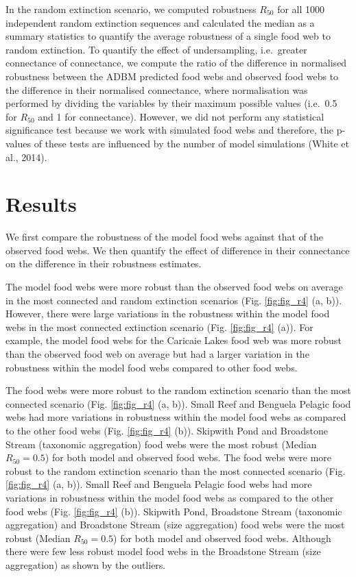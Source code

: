 \documentclass{article}
\begin{document}
In the random extinction scenario, we computed robustness \(R_{50}\) for
all 1000 independent random extinction sequences and calculated the
median as a summary statistics to quantify the average robustness of a
single food web to random extinction. To quantify the effect of
undersampling, i.e.~greater connectance of connectance, we compute the
ratio of the difference in normalised robustness between the ADBM
predicted food webs and observed food webs to the difference in their
normalised connectance, where normalisation was performed by dividing
the variables by their maximum possible values (i.e.~0.5 for \(R_{50}\)
and 1 for connectance). However, we did not perform any statistical
significance test because we work with simulated food webs and
therefore, the p-values of these tests are influenced by the number of
model simulations (White et al., 2014).

\hypertarget{results}{%
\section{Results}\label{results}}

We first compare the robustness of the model food webs against that of
the observed food webs. We then quantify the effect of difference in
their connectance on the difference in their robustness estimates.

The model food webs were more robust than the observed food webs on
average in the most connected and random extinction scenarios (Fig.
\ref{fig:fig_r4} (a, b)). However, there were large variations in the
robustness within the model food webs in the most connected extinction
scenario (Fig. \ref{fig:fig_r4} (a)). For example, the model food webs
for the Caricaie Lakes food web was more robust than the observed food
web on average but had a larger variation in the robustness within the
model food webs compared to other food webs.

The food webs were more robust to the random extinction scenario than
the most connected scenario (Fig. \ref{fig:fig_r4} (a, b)). Small Reef
and Benguela Pelagic food webs had more variations in robustness within
the model food webs as compared to the other food webs (Fig.
\ref{fig:fig_r4} (b)). Skipwith Pond and Broadstone Stream (taxonomic
aggregation) food webs were the most robust (Median \(R_{50} = 0.5\))
for both model and observed food webs. The food webs were more robust to
the random extinction scenario than the most connected scenario (Fig.
\ref{fig:fig_r4} (a, b)). Small Reef and Benguela Pelagic food webs had
more variations in robustness within the model food webs as compared to
the other food webs (Fig. \ref{fig:fig_r4} (b)). Skipwith Pond,
Broadstone Stream (taxonomic aggregation) and Broadstone Stream (size
aggregation) food webs were the most robust (Median \(R_{50} = 0.5\))
for both model and observed food webs. Although there were few less
robust model food webs in the Broadstone Stream (size aggregation) as
shown by the outliers.
\end{document}
